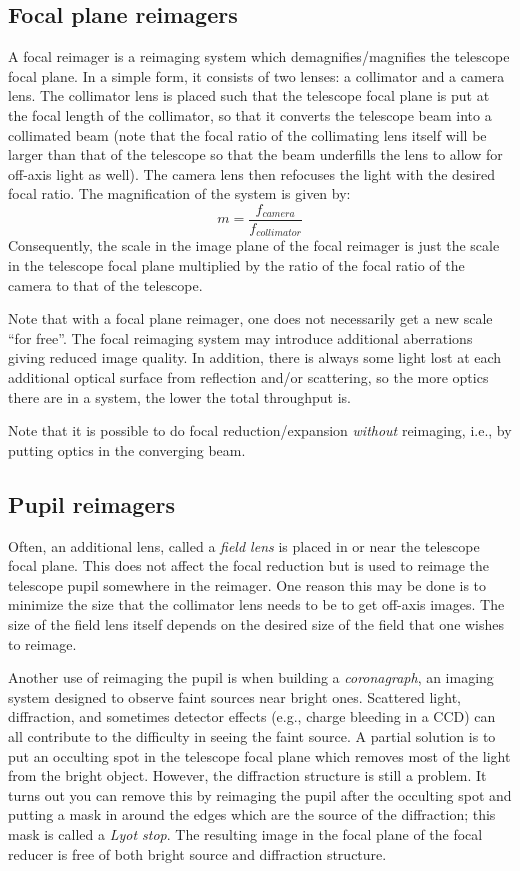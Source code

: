 \documentclass[12pt]{article}
\begin{document}
\subsection{Focal plane reimagers}
A focal reimager is a reimaging system which demagnifies/magnifies the
telescope focal plane. In a simple form, it consists of two lenses: a
collimator and a camera lens. The collimator lens is placed such that
the telescope focal plane is put at the focal length of the
collimator, so that it converts the telescope beam into a collimated
beam (note that the focal ratio of the collimating lens itself will be
larger than that of the telescope so that the beam underfills the lens
to allow for off-axis light as well). The camera lens then refocuses
the light with the desired focal ratio. The magnification of the
system is given by:
\[
    m = \frac{f_{camera}}{f_{collimator}}
    \]
Consequently, the scale in the image plane of the focal reimager is
just the scale in the telescope focal plane multiplied by the ratio of
the focal ratio of the camera to that of the telescope.

Note that with a focal plane reimager, one does not necessarily get a
new scale ``for free''. The focal reimaging system may introduce
additional aberrations giving reduced image quality. In addition,
there is always some light lost at each additional optical surface from
reflection and/or scattering, so the more optics there are in a system,
the lower the total throughput is.

Note that it is possible to do focal reduction/expansion
\emph{without} reimaging, i.e., by putting optics in the converging beam.

\subsection{Pupil reimagers}
Often, an additional lens, called a \textit{field lens} is placed in or near
the telescope focal plane. This does not affect the focal reduction
but is used to reimage the telescope pupil somewhere in the reimager.
One reason this may be done is to minimize the size that the
collimator lens needs to be to get off-axis images. The size of the
field lens itself depends on the desired size of the field that one
wishes to reimage.

Another use of reimaging the pupil is when building a \textit{coronagraph}, an
imaging system designed to observe faint sources near bright ones. Scattered
light, diffraction, and sometimes detector effects (e.g., charge bleeding in a
CCD) can all contribute to the difficulty in seeing the faint source. A partial
solution is to put an occulting spot in the telescope focal plane which removes
most of the light from the bright object. However, the diffraction structure is
still a problem. It turns out you can remove this by reimaging the pupil after
the occulting spot and putting a mask in around the edges which are the source
of the diffraction; this mask is called a \emph{Lyot stop}. The resulting image
in the focal plane of the focal reducer is free of both bright source and
diffraction structure.
\end{document}
